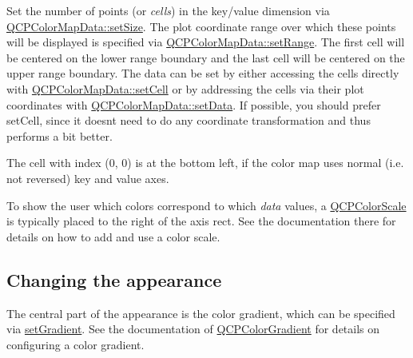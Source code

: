 Set the number of points (or {\itshape cells}) in the key/value dimension via \hyperlink{class_q_c_p_color_map_data_a0d9ff35c299d0478b682bfbcdd9c097e}{Q\+C\+P\+Color\+Map\+Data\+::set\+Size}. The plot coordinate range over which these points will be displayed is specified via \hyperlink{class_q_c_p_color_map_data_aad9c1c7c703c1339489fc730517c83d4}{Q\+C\+P\+Color\+Map\+Data\+::set\+Range}. The first cell will be centered on the lower range boundary and the last cell will be centered on the upper range boundary. The data can be set by either accessing the cells directly with \hyperlink{class_q_c_p_color_map_data_a8e75eaf8746596319032a93f3d2d0683}{Q\+C\+P\+Color\+Map\+Data\+::set\+Cell} or by addressing the cells via their plot coordinates with \hyperlink{class_q_c_p_color_map_data_afd2083ccfd6987ec94aa7ef8e91ca39a}{Q\+C\+P\+Color\+Map\+Data\+::set\+Data}. If possible, you should prefer set\+Cell, since it doesn\textquotesingle{}t need to do any coordinate transformation and thus performs a bit better.

The cell with index (0, 0) is at the bottom left, if the color map uses normal (i.\+e. not reversed) key and value axes.

To show the user which colors correspond to which {\itshape data} values, a \hyperlink{class_q_c_p_color_scale}{Q\+C\+P\+Color\+Scale} is typically placed to the right of the axis rect. See the documentation there for details on how to add and use a color scale.\hypertarget{class_q_c_p_statistical_box_appearance}{}\subsection{Changing the appearance}\label{class_q_c_p_statistical_box_appearance}
The central part of the appearance is the color gradient, which can be specified via \hyperlink{class_q_c_p_color_map_a7313c78360471cead3576341a2c50377}{set\+Gradient}. See the documentation of \hyperlink{class_q_c_p_color_gradient}{Q\+C\+P\+Color\+Gradient} for details on configuring a color gradient.

